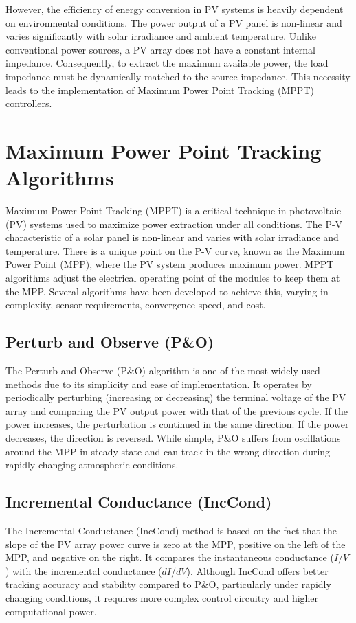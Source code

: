 \documentclass[a4paper,oneside,12pt]{report}
\numberwithin{equation}{chapter}
\begin{document}
However, the efficiency of energy conversion in PV systems is heavily dependent on environmental conditions. The power output of a PV panel is non-linear and varies significantly with solar irradiance and ambient temperature. Unlike conventional power sources, a PV array does not have a constant internal impedance. Consequently, to extract the maximum available power, the load impedance must be dynamically matched to the source impedance. This necessity leads to the implementation of Maximum Power Point Tracking (MPPT) controllers.

\section{Maximum Power Point Tracking Algorithms}
\label{sec:intro_mppt_techniques}
Maximum Power Point Tracking (MPPT) is a critical technique in photovoltaic (PV) systems used to maximize power extraction under all conditions. The P-V characteristic of a solar panel is non-linear and varies with solar irradiance and temperature. There is a unique point on the P-V curve, known as the Maximum Power Point (MPP), where the PV system produces maximum power. MPPT algorithms adjust the electrical operating point of the modules to keep them at the MPP. Several algorithms have been developed to achieve this, varying in complexity, sensor requirements, convergence speed, and cost.

\subsection{Perturb and Observe (P\&O)}
The Perturb and Observe (P\&O) algorithm is one of the most widely used methods due to its simplicity and ease of implementation. It operates by periodically perturbing (increasing or decreasing) the terminal voltage of the PV array and comparing the PV output power with that of the previous cycle. If the power increases, the perturbation is continued in the same direction. If the power decreases, the direction is reversed. While simple, P\&O suffers from oscillations around the MPP in steady state and can track in the wrong direction during rapidly changing atmospheric conditions.

\subsection{Incremental Conductance (IncCond)}
The Incremental Conductance (IncCond) method is based on the fact that the slope of the PV array power curve is zero at the MPP, positive on the left of the MPP, and negative on the right. It compares the instantaneous conductance ($I/V$) with the incremental conductance ($dI/dV$). Although IncCond offers better tracking accuracy and stability compared to P\&O, particularly under rapidly changing conditions, it requires more complex control circuitry and higher computational power.
\end{document}
